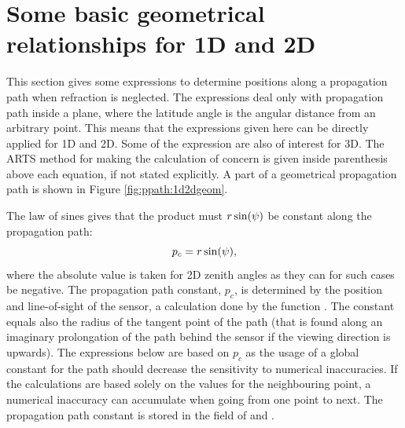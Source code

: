 





\section{Some basic geometrical relationships for 1D and 2D}
\label{sec:ppath:basicgeom}

This section gives some expressions to determine positions along a
propagation path when refraction is neglected. The expressions deal
only with propagation path inside a plane, where the latitude angle is
the angular distance from an arbitrary point. This means that the
expressions given here can be directly applied for 1D and 2D. Some of
the expression are also of interest for 3D. The ARTS method for making
the calculation of concern is given inside parenthesis above each
equation, if not stated explicitly. A part of a geometrical
propagation path is shown in Figure \ref{fig:ppath:1d2dgeom}.

The law of sines gives that the product must $r\sin(\psi)$ be
constant along the propagation path:
\begin{equation}
  p_c = r\sin(\psi),
  \label{eq:ppath:geomconst}
\end{equation}
where the absolute value is taken for 2D zenith angles as they can for
such cases be negative. The propagation path constant, $p_c$, is
determined by the position and line-of-sight of the sensor, a
calculation done by the function . The
constant equals also the radius of the tangent point of the path (that
is found along an imaginary prolongation of the path behind the sensor
if the viewing direction is upwards). The expressions below are based
on $p_c$ as the usage of a global constant for the path should
decrease the sensitivity to numerical inaccuracies. If the
calculations are based solely on the values for the neighbouring
point, a numerical inaccuracy can accumulate when going from one point
to next. The propagation path constant is stored in the field
 of  and .

